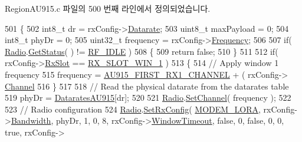 Region\+A\+U915.\+c 파일의 500 번째 라인에서 정의되었습니다.


\begin{DoxyCode}
501 \{
502     int8\_t dr = rxConfig->\mbox{\hyperlink{structs_rx_config_params_ae2f6080f3aa0e9485c55513ca56bb24d}{Datarate}};
503     uint8\_t maxPayload = 0;
504     int8\_t phyDr = 0;
505     uint32\_t frequency = rxConfig->\mbox{\hyperlink{structs_rx_config_params_ade3d190636488dad9a89b19446b7acf1}{Frequency}};
506 
507     \textcolor{keywordflow}{if}( \mbox{\hyperlink{sx1276mb1las_8c_acf9fe61a72c16fa29a0dc449d23e3820}{Radio}}.\mbox{\hyperlink{struct_radio__s_a8d469520cd62ec3004a50fcaa31d8c72}{GetStatus}}( ) != \mbox{\hyperlink{radio_8h_a2f3fa4ad0237c4ace94aa99086aac9f5a89c1ff89fc074c1c80f96d186c99f899}{RF\_IDLE}} )
508     \{
509         \textcolor{keywordflow}{return} \textcolor{keyword}{false};
510     \}
511 
512     \textcolor{keywordflow}{if}( rxConfig->\mbox{\hyperlink{structs_rx_config_params_a0a258bf8cfad5219bfd579257e523fc1}{RxSlot}} == \mbox{\hyperlink{group___l_o_r_a_m_a_c_gga933a5a2f7d57b1a5cb22f061e30558fea5fa7051b96e31f50660867ec02cb6624}{RX\_SLOT\_WIN\_1}} )
513     \{
514         \textcolor{comment}{// Apply window 1 frequency}
515         frequency = \mbox{\hyperlink{group___r_e_g_i_o_n_a_u915_ga006dab0130b61538f621e80e9f6028ce}{AU915\_FIRST\_RX1\_CHANNEL}} + ( rxConfig->
      \mbox{\hyperlink{structs_rx_config_params_a1ca6f01ca18afe402de51babe8c95f5e}{Channel}} %
516     \}
517 
518     \textcolor{comment}{// Read the physical datarate from the datarates table}
519     phyDr = \mbox{\hyperlink{group___r_e_g_i_o_n_a_u915_gaf86f3852261cee915f4132bd35e6c188}{DataratesAU915}}[dr];
520 
521     \mbox{\hyperlink{sx1276mb1las_8c_acf9fe61a72c16fa29a0dc449d23e3820}{Radio}}.\mbox{\hyperlink{struct_radio__s_a691bfd16e5be0274cbfe0d7454749f12}{SetChannel}}( frequency );
522 
523     \textcolor{comment}{// Radio configuration}
524     \mbox{\hyperlink{sx1276mb1las_8c_acf9fe61a72c16fa29a0dc449d23e3820}{Radio}}.\mbox{\hyperlink{struct_radio__s_ae4e2616b2534ce84bf4110dc6d31f82f}{SetRxConfig}}( \mbox{\hyperlink{radio_8h_a992ef7a5b7f52975ba7bd8dd97740057abeb331e097974ea65b07d74df9e85a8e}{MODEM\_LORA}}, rxConfig->\mbox{\hyperlink{structs_rx_config_params_aa8fc32e4883d30642e0ceb5845006a57}{Bandwidth}}, phyDr, 1, 0, 8, 
      rxConfig->\mbox{\hyperlink{structs_rx_config_params_a9d9f6c16ea62e2bcc09b100e2cb83e3f}{WindowTimeout}}, \textcolor{keyword}{false}, 0, \textcolor{keyword}{false}, 0, 0, \textcolor{keyword}{true}, rxConfig->

\end{DoxyCode}
